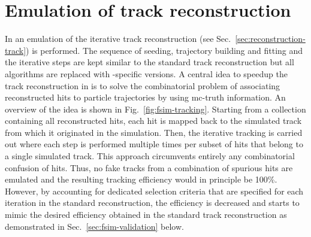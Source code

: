 



\section{Emulation of track reconstruction}
\label{sec:fsim-tracking}

In \FSIM an emulation of the iterative track reconstruction (see Sec.~\ref{sec:reconstruction-track}) is performed. The sequence of seeding, trajectory building and fitting and the iterative steps are kept similar to the standard track reconstruction but all algorithms are replaced with \FSIM-specific versions. A central idea to speedup the track reconstruction in \FSIM is to solve the combinatorial problem of associating reconstructed hits to particle trajectories by using \gls{mc}-truth information. An overview of the idea is shown in Fig.~\ref{fig:fsim-tracking}. Starting from a collection containing all reconstructed hits, each hit is mapped back to the simulated track from which it originated in the simulation. Then, the iterative tracking is carried out where each step is performed multiple times per subset of hits that belong to a single simulated track. This approach circumvents entirely any combinatorial confusion of hits. Thus, no fake tracks from a combination of spurious hits are emulated and the resulting tracking efficiency would in principle be 100\%. However, by accounting for dedicated selection criteria that are specified for each iteration in the standard reconstruction, the efficiency is decreased and starts to mimic the desired efficiency obtained in the standard track reconstruction as demonstrated in Sec.~\ref{sec:fsim-validation} below.

